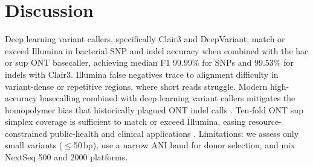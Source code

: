 \documentclass[11pt]{article}
\begin{document}
\section{Discussion}
Deep learning variant callers, specifically Clair3 and DeepVariant, match or exceed Illumina in bacterial SNP and indel accuracy when combined with the hac or sup ONT basecaller, achieving median F1 99.99\% for SNPs and 99.53\% for indels with Clair3. Illumina false negatives trace to alignment difficulty in variant-dense or repetitive regions, where short reads struggle. Modern high-accuracy basecalling combined with deep learning variant callers mitigates the homopolymer bias that historically plagued ONT indel calls \citep{r9,r13}. Ten-fold ONT sup simplex coverage is sufficient to match or exceed Illumina, easing resource-constrained public-health and clinical applications \citep{r2,r7,r8,r37,r38,r39,r40}. Limitations: we assess only small variants ($\leq$50\,bp), use a narrow ANI band for donor selection, and mix NextSeq 500 and 2000 platforms.



\end{document}
